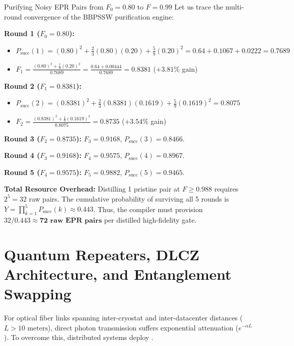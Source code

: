 \begin{examplebox}{Purifying Noisy EPR Pairs from $F_0 = 0.80$ to $F = 0.99$}
Let us trace the multi-round convergence of the BBPSSW purification engine:

\textbf{Round 1 ($F_0 = 0.80$):}
\begin{itemize}
    \item $P_{\text{succ}}(1) = (0.80)^2 + \frac{2}{3}(0.80)(0.20) + \frac{5}{9}(0.20)^2 = 0.64 + 0.1067 + 0.0222 = 0.7689$
    \item $F_1 = \frac{(0.80)^2 + \frac{1}{9}(0.20)^2}{0.7689} = \frac{0.64 + 0.00444}{0.7689} = \mathbf{0.8381}$ ($+3.81\%$ gain)
\end{itemize}

\textbf{Round 2 ($F_1 = 0.8381$):}
\begin{itemize}
    \item $P_{\text{succ}}(2) = (0.8381)^2 + \frac{2}{3}(0.8381)(0.1619) + \frac{5}{9}(0.1619)^2 = 0.8075$
    \item $F_2 = \frac{(0.8381)^2 + \frac{1}{9}(0.1619)^2}{0.8075} = \mathbf{0.8735}$ ($+3.54\%$ gain)
\end{itemize}

\textbf{Round 3 ($F_2 = 0.8735$):} $F_3 = \mathbf{0.9168}$, $P_{\text{succ}}(3) = 0.8466$.

\textbf{Round 4 ($F_3 = 0.9168$):} $F_4 = \mathbf{0.9575}$, $P_{\text{succ}}(4) = 0.8967$.

\textbf{Round 5 ($F_4 = 0.9575$):} $F_5 = \mathbf{0.9882}$, $P_{\text{succ}}(5) = 0.9465$.

\textbf{Total Resource Overhead:} Distilling 1 pristine pair at $F \ge 0.988$ requires $2^5 = 32$ raw pairs. The cumulative probability of surviving all 5 rounds is $Y = \prod_{k=1}^5 P_{\text{succ}}(k) \approx 0.443$. Thus, the compiler must provision $32 / 0.443 \approx \mathbf{72\text{ raw EPR pairs}}$ per distilled high-fidelity gate.
\end{examplebox}

\section{Quantum Repeaters, DLCZ Architecture, and Entanglement Swapping}
\label{sec:quantum_repeaters}

For optical fiber links spanning inter-cryostat and inter-datacenter distances ($L > 10\text{ meters}$), direct photon transmission suffers exponential attenuation ($e^{-\alpha L}$). To overcome this, distributed systems deploy .

